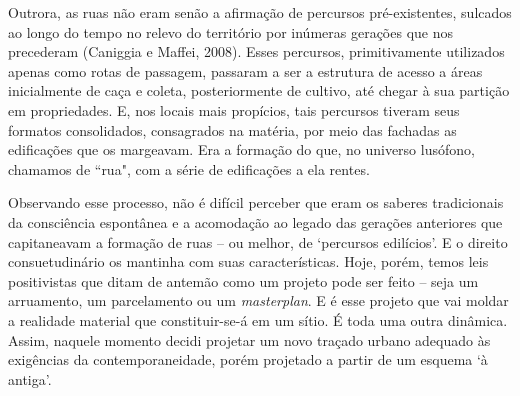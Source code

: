 \documentclass[12pt, a4paper]{book} %
\begin{document}
        Outrora, as ruas não eram senão a afirmação de percursos pré-existentes, sulcados ao longo do tempo no relevo do território por inúmeras gerações que nos precederam (Caniggia e Maffei, 2008).   Esses percursos, primitivamente utilizados apenas como rotas de passagem, passaram a ser a estrutura de acesso a áreas inicialmente de caça e coleta, posteriormente de cultivo, até chegar à sua partição em propriedades. E, nos locais mais propícios, tais percursos tiveram seus formatos consolidados, consagrados na matéria, por meio das fachadas as edificações que os margeavam. Era a formação do que, no universo lusófono, chamamos de ``rua", com a série de edificações a ela rentes.

        Observando esse processo, não é difícil perceber que eram os saberes tradicionais da consciência espontânea e a acomodação ao legado das gerações anteriores que capitaneavam a formação de ruas – ou melhor, de `percursos edilícios'. E o direito consuetudinário os mantinha com suas características. Hoje, porém, temos leis positivistas que ditam de antemão como um projeto pode ser feito – seja um arruamento, um parcelamento ou um \textit{masterplan}. E é esse projeto que vai moldar a realidade material que constituir-se-á em um sítio. É toda uma outra dinâmica. Assim, naquele momento decidi projetar um novo traçado urbano adequado às exigências da contemporaneidade, porém projetado a partir de um esquema `à antiga'.
\end{document}
